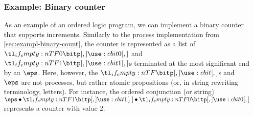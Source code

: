 \subsubsection{Example: Binary counter}\label{sec:exampl-binary-count-2}

As an example of an ordered logic program, we can implement a binary counter that supports increments.
Similarly to the process implementation from \cref{sec:exampl-binary-count}, the counter is represented as a list of $\bit{0}$ and $\bit{1}$s terminated at the most significant end by an $\eps$.
Here, however, the $\bit{}$s and $\eps$ are not processes, but rather atomic propositions (or, in string rewriting terminology, letters).
For instance, the ordered conjunction (or string) $\eps \fuse \bit{1} \fuse \bit{0}$ represents a counter with value $2$.


